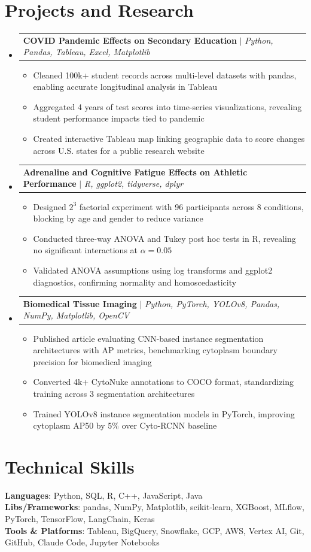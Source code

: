 \documentclass[letterpaper,11pt]{article}
\makeatletter
\newcommand{\resumeItem}[1]{
  \item\small{#1}
}
\newcommand{\resumeProjectHeading}[2]{
    \item
    \begin{tabular*}{\textwidth}{l@{\extracolsep{\fill}}r}
      #1 & #2 \\
    \end{tabular*}\vspace{-7pt}
}
\newcommand{\resumeSubHeadingListStart}{\begin{itemize}[leftmargin=0in, label={}]}
\newcommand{\resumeSubHeadingListEnd}{\end{itemize}}
\newcommand{\resumeItemListStart}{\begin{itemize}[itemsep= 1.5pt, parsep=0pt]}
\newcommand{\resumeItemListEnd}{\end{itemize}\vspace{-5pt}}
\makeatother
\begin{document}
\section{Projects and Research}
    \resumeSubHeadingListStart
      \resumeProjectHeading
          {\textbf{COVID Pandemic Effects on Secondary Education} $|$ \textit{Python, Pandas, Tableau, Excel, Matplotlib}}{}
          \resumeItemListStart
            \resumeItem{Cleaned 100k+ student records across multi-level datasets with pandas, enabling accurate longitudinal analysis in Tableau}
            \resumeItem{Aggregated 4 years of test scores into time-series visualizations, revealing student performance impacts tied to pandemic}
            \resumeItem{Created interactive Tableau map linking geographic data to score changes across U.S. states for a public research website}
          \resumeItemListEnd
      \resumeProjectHeading
          {\textbf{Adrenaline and Cognitive Fatigue Effects on Athletic Performance} $|$ \textit{R, ggplot2, tidyverse, dplyr}}{}
          \resumeItemListStart
            \resumeItem{Designed $2^3$ factorial experiment with 96 participants across 8 conditions, blocking by age and gender to reduce variance}
            \resumeItem{Conducted three-way ANOVA and Tukey post hoc tests in R, revealing no significant interactions at $\alpha = 0.05$}
            \resumeItem{Validated ANOVA assumptions using log transforms and ggplot2 diagnostics, confirming normality and homoscedasticity}
          \resumeItemListEnd
      \resumeProjectHeading
          {\textbf{Biomedical Tissue Imaging} $|$ \textit{Python, PyTorch, YOLOv8, Pandas, NumPy, Matplotlib, OpenCV}}{}
          \resumeItemListStart
            \resumeItem{Published article evaluating CNN-based instance segmentation architectures with AP metrics, benchmarking cytoplasm boundary precision for biomedical imaging}
            \resumeItem{Converted 4k+ CytoNuke annotations to COCO format, standardizing training across 3 segmentation architectures}
            \resumeItem{Trained YOLOv8 instance segmentation models in PyTorch, improving cytoplasm AP50 by 5\% over Cyto-RCNN baseline}
          \resumeItemListEnd
    \resumeSubHeadingListEnd
\section{Technical Skills}
 \begin{itemize}[leftmargin=0in, label={}]
    \small{\item{
     \textbf{Languages}{: Python, SQL, R, C++, JavaScript, Java} \\
     \textbf{Libs/Frameworks}{: pandas, NumPy, Matplotlib, scikit-learn, XGBoost, MLflow, PyTorch, TensorFlow, LangChain, Keras} \\
     \textbf{Tools \& Platforms}{: Tableau, BigQuery, Snowflake, GCP, AWS, Vertex AI, Git, GitHub, Claude Code, Jupyter Notebooks}
    }}
 \end{itemize}
\end{document}

